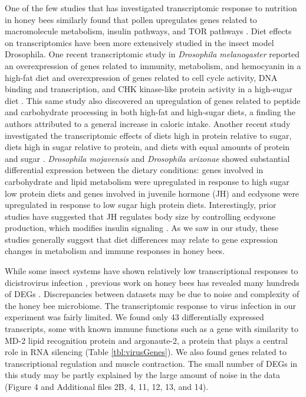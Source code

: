\documentclass{bmcart}
\begin{document}
\begin{linenumbers}
\begin{doublespacing}
One of the few studies that has investigated transcriptomic response to nutrition in honey bees similarly found that pollen upregulates genes related to macromolecule metabolism, insulin pathways, and TOR pathways \cite{alaux2}. Diet effects on transcriptomics have been more extensively studied in the insect model Drosophila. One recent transcriptomic study in \textit{Drosophila melanogaster} reported an overexpression of genes related to immunity, metabolism, and hemocyanin in a high-fat diet and overexpression of genes related to cell cycle activity, DNA binding and transcription, and CHK kinase-like protein activity in a high-sugar diet \cite{sugarFat}. This same study also discovered an upregulation of genes related to peptide and carbohydrate processing in both high-fat and high-sugar diets, a finding the authors attributed to a general increase in caloric intake. Another recent study investigated the transcriptomic effects of diets high in protein relative to sugar, diets high in sugar relative to protein, and diets with equal amounts of protein and sugar \cite{sugarProtein}. \textit{Drosophila mojavensis} and \textit{Drosophila arizonae} showed substantial differential expression between the dietary conditions: genes involved in carbohydrate and lipid metabolism were upregulated in response to high sugar low protein diets and genes involved in juvenile hormone (JH) and ecdysone were upregulated in response to low sugar high protein diets. Interestingly, prior studies have suggested that JH regulates body size by controlling ecdysone production, which modifies insulin signaling \cite{jHormone}. As we saw in our study, these studies generally suggest that diet differences may relate to gene expression changes in metabolism and immune responses in honey bees.

While some insect systems have shown relatively low transcriptional responses to dicistrovirus infection \cite{fewDEGs, fewDEGs2}, previous work on honey bees has revealed many hundreds of DEGs \cite{galbraith}. Discrepancies between datasets may be due to noise and complexity of the honey bee microbiome. The transcriptomic response to virus infection in our experiment was fairly limited. We found only 43 differentially expressed transcripts, some with known immune functions such as a gene with similarity to MD-2 lipid recognition protein and argonaute-2, a protein that plays a central role in RNA silencing (Table \ref{tbl:virusGenes}). We also found genes related to transcriptional regulation and muscle contraction. The small number of DEGs in this study may be partly explained by the large amount of noise in the data (Figure 4 and Additional files 2B, 4, 11, 12, 13, and 14).


\end{doublespacing}
\end{linenumbers}
\end{document}
